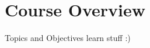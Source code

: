 \section{Course Overview}

\begin{definition}{Topics and Objectives}
    learn stuff :)
\end{definition}
